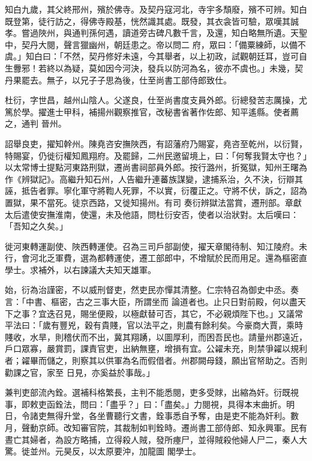 \begin{pinyinscope}
 知白九歲，其父終邢州，殯於佛寺。及契丹寇河北，寺宇多頹廢，殯不可辨。知白既登第，徒行訪之，得佛寺殿基，恍然識其處。既發，其衣衾皆可驗，眾嘆其誠孝。嘗過陜州，與通判孫何遇，讀道旁古碑凡數千言，及還，知白略無所遺。天聖中，契丹大閱，聲言獵幽州，朝廷患之。帝以問二
 府，眾曰：「備粟練師，以備不虞。」知白曰：「不然，契丹修好未遠，今其舉者，以上初政，試觀朝廷耳，豈可自生釁邪！若終以為疑，莫如因今河決，發兵以防河為名，彼亦不虞也。」未幾，契丹果罷去。無子，以兄子子思為後，仕至尚書工部侍郎致仕。



 杜衍，字世昌，越州山陰人。父遂良，仕至尚書度支員外郎。衍總發苦志厲操，尤篤於學。擢進士甲科，補揚州觀察推官，改秘書省著作佐郎、知平遙縣。使者薦之，通判
 晉州。



 詔舉良吏，擢知幹州。陳堯咨安撫陜西，有詔藩府乃賜宴，堯咨至乾州，以衍賢，特賜宴，仍徙衍權知鳳翔府。及罷歸，二州民邀留境上，曰：「何奪我賢太守也？」以太常博士提點河東路刑獄，遷尚書祠部員外郎。按行潞州，折冤獄，知州王曙為作《辨獄記》。高繼升知石州，人告繼升連蕃族謀變，逮捕系治，久不決，衍辯其誣，抵告者罪。寧化軍守將鞫人死罪，不以實，衍覆正之。守將不伏，訴之，詔為置獄，果不當死。徒京西路，又徙知揚州。有司
 奏衍辨獄法當賞，遷刑部。章獻太后遣使安撫淮南，使還，未及他語，問杜衍安否，使者以治狀對。太后嘆曰：「吾知之久矣。」



 徙河東轉運副使、陜西轉運使。召為三司戶部副使，擢天章閣待制、知江陵府。未行，會河北乏軍費，選為都轉運使，遷工部郎中，不增賦於民而用足。還為樞密直學士。求補外，以右諫議大夫知天雄軍。



 始，衍為治謹密，不以威刑督吏，然吏民亦憚其清整。仁宗特召為御史中丞。奏言：「中書、樞密，古之三事大臣，所謂坐而
 論道者也。止只日對前殿，何以盡天下之事？宜迭召見，賜坐便殿，以極獻替可否，其它，不必親煩陛下也。」又議常平法曰：「歲有豐兇，穀有貴賤，官以法平之，則農有餘利矣。今豪商大賈，乘時賤收，水旱，則稽伏而不出，冀其翔踴，以圖厚利，而困吾民也。請量州郡遠近，戶口眾寡，嚴賞罰，課責官吏，出納無壅，增損有宜。公糴未充，則禁爭糴以規利者；糴畢而儲之，則察其以供軍為名而假借者。州郡闕母錢，願出官帑助之。否則勸課之官，家至
 日見，亦奚益於事哉。」



 兼判吏部流內銓。選補科格繁長，主判不能悉閱，吏多受賕，出縮為奸。衍既視事，即敕吏函銓法，問曰：「盡乎？」曰：「盡矣。」力閱視，具得本末曲折。明日，令諸吏無得升堂，各坐曹聽行文書，銓事悉自予奪，由是吏不能為奸利。數月，聲動京師。改知審官院，其裁制如判銓時。遷尚書工部侍郎、知永興軍。民有晝亡其婦者，為設方略捕，立得殺人賊，發所瘞尸，並得賊殺他婦人尸二，秦人大驚。徙並州。元昊反，以太原要沖，加龍圖
 閣學士。




\end{pinyinscope}
